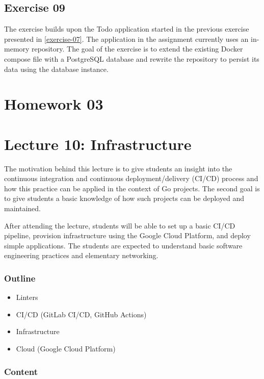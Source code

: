 \documentclass[
  digital,
  color,
  oneside,
  nosansbold,
  nocolorbold,
  nolof,
  nolot,
]{fithesis4}
\begin{document}
\subsection{Exercise 09}\label{exercise-09}

The exercise builds upon the Todo application started in the previous exercise presented in \cref{exercise-07}. The application in the assignment currently uses an in-memory repository. The goal of the exercise is to extend the existing Docker compose file with a PostgreSQL\cite{postgres} database and rewrite the repository to persist its data using the database instance.

\section{Homework 03}

\section{Lecture 10: Infrastructure}\label{lecture-infrastructure}

The motivation behind this lecture is to give students an insight into the continuous integration and continuous deployment/delivery (CI/CD) process and how this practice can be applied in the context of Go projects. The second goal is to give students a basic knowledge of how such projects can be deployed and maintained.

After attending the lecture, students will be able to set up a basic CI/CD pipeline, provision infrastructure using the Google Cloud Platform, and deploy simple applications. The students are expected to understand basic software engineering practices and elementary networking.

\subsubsection{Outline}

\begin{itemize}
    \item Linters
    \item CI/CD (GitLab CI/CD, GitHub Actions)
    \item Infrastructure
    \item Cloud (Google Cloud Platform)
\end{itemize}

\subsubsection{Content}
\end{document}
